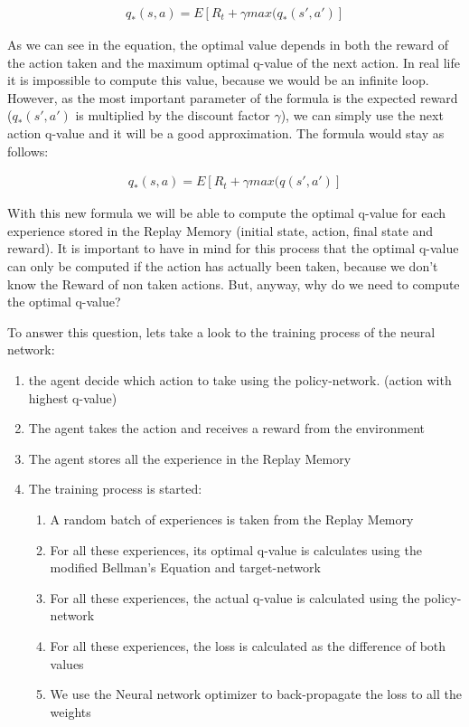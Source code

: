 			\begin{gather*}
				q_*(s,a) = E[ R_t + \gamma max(q_*(s', a' )]
			\end{gather*}
			
			As we can see in the equation, the optimal value depends in both the reward of the action taken and the maximum optimal q-value of the next action. In real life it is impossible to compute this value, because we would be an infinite loop. However, as the most important parameter of the formula is the expected reward ($q_*(s', a' )$ is multiplied by the discount factor $\gamma$), we can simply use the next action q-value and it will be a good approximation. The formula would stay as follows:
			
			\begin{gather*}
				q_*(s,a) = E[ R_t + \gamma max(q(s', a' )]
			\end{gather*}
		
			With this new formula we will be able to compute the optimal q-value for each experience stored in the Replay Memory (initial state, action, final state and reward). It is important to have in mind for this process that the optimal q-value can only be computed if the action has actually been taken, because we don't know the Reward of non taken actions. But, anyway, why do we need to compute the optimal q-value?
			
			To answer this question, lets take a look to the training process of the neural network:
			
			\begin{enumerate}
				\item the agent decide which action to take using the policy-network. (action with highest q-value)
				\item The agent takes the action and receives a reward from the environment
				\item The agent stores all the experience in the Replay Memory
				\item The training process is started:
				\begin{enumerate}
					\item A random batch of experiences is taken from the Replay Memory
					\item For all these experiences, its optimal q-value is calculates using the modified Bellman's Equation and target-network
					\item For all these experiences, the actual q-value is calculated using the policy-network
					\item For all these experiences, the loss is calculated as the difference of both values
					\item We use the Neural network optimizer to back-propagate the loss to all the weights
				\end{enumerate}
			\end{enumerate}
		
